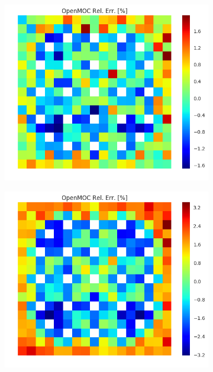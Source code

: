 \begin{figure}[h!]
\begin{subfigure}{.33\textwidth}
  \caption{}
  \label{fig:chap8-assm-1.6-inf-capt-8}
\end{subfigure}%
\begin{subfigure}{.33\textwidth}
  \centering
  \includegraphics[width=\linewidth]{figures/quantification/assm-16/infinite-capt-err-70}
  \caption{}
  \label{fig:chap8-assm-1.6-inf-capt-70}
\end{subfigure}
\begin{subfigure}{.33\textwidth}
  \centering
  \includegraphics[width=\linewidth]{figures/quantification/assm-16/null-capt-err-2}

\end{subfigure}
\end{figure}
